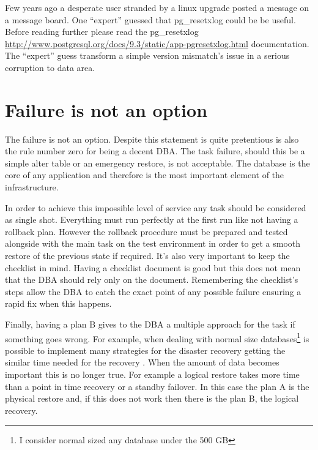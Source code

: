 Few years ago a desperate user stranded by a linux upgrade posted a message on a message 
board. One ``expert'' guessed that pg\_resetxlog could be be useful. Before reading further please read the 
pg\_resetxlog 
\href{http://www.postgresql.org/docs/9.3/static/app-pgresetxlog.html}{
http://www.postgresql.org/docs/9.3/static/app-pgresetxlog.html} documentation. The ``expert'' guess 
transform a simple version mismatch's issue in a serious corruption to data area.

\section{Failure is not an option}
The failure is not an option. Despite this statement is quite pretentious is also the rule number 
zero for being a decent DBA. The task failure, should this be a simple alter table or an emergency 
restore, is not acceptable. The database is the core of any application and therefore is the most important 
element of the infrastructure.\newline

In order to achieve this impossible level of service any task should be considered as single shot. 
Everything must run perfectly at the first run like not having a rollback plan. However the rollback 
procedure must be prepared and tested alongside with the main task on the test environment in order to get a 
smooth restore of the previous state if required. It's also very important to keep the checklist in mind. 
Having a checklist document is good but this does not mean that the DBA should rely only on the 
document. Remembering the checklist's steps allow the DBA to catch the exact point of any possible failure 
ensuring a rapid fix when this happens.\newline

Finally, having a plan B gives to the DBA a multiple approach for the task if something goes wrong. For 
example, when dealing with normal size databases\footnote{I consider normal sized any database under the 500 
GB} is possible to implement many strategies for the disaster recovery getting the similar time needed for 
the recovery . When the amount of data becomes important this is no longer true. For example a logical 
restore takes more time than a point in time recovery or a standby failover. In this case the plan A is the 
physical restore and, if this does not work then there is the plan B, the logical recovery.

